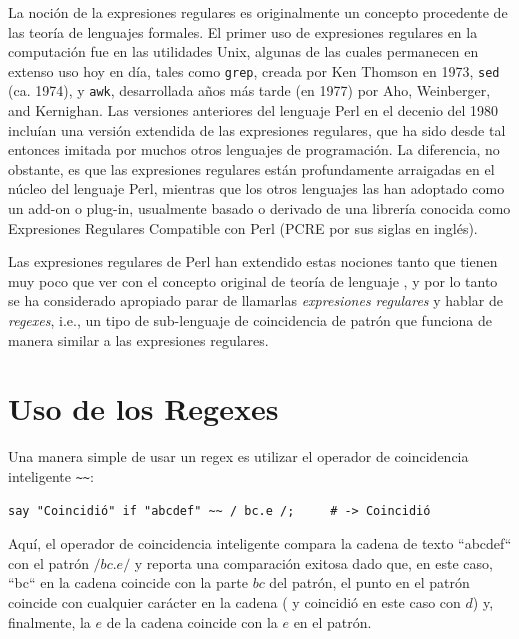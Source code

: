 La noción de la expresiones regulares es originalmente un 
concepto procedente de las teoría de lenguajes formales. 
El primer uso de expresiones regulares en la computación fue 
en las utilidades Unix, algunas de las cuales permanecen en 
extenso uso hoy en día, tales como {\tt grep}, creada por Ken Thomson en 1973,
{\tt sed} (ca. 1974), y {\tt awk}, desarrollada años más tarde (en 1977)
por  Aho, Weinberger, and Kernighan. 
Las versiones anteriores del lenguaje Perl en el decenio del 1980
incluían una versión extendida de las expresiones regulares, que 
ha sido desde tal entonces imitada por muchos otros lenguajes de
programación. La diferencia, no obstante, es que las expresiones
regulares están profundamente arraigadas en el núcleo del lenguaje
Perl, mientras que los otros lenguajes las han adoptado como un
add-on o plug-in, usualmente basado o derivado de una librería 
conocida como Expresiones Regulares Compatible con Perl (PCRE 
por sus siglas en inglés).

Las expresiones regulares de Perl han extendido estas nociones
tanto que tienen muy poco que ver con el concepto original de 
teoría de lenguaje , y por lo tanto se ha considerado 
apropiado parar de llamarlas \emph{expresiones regulares}
y hablar de \emph{regexes}, i.e., un tipo de sub-lenguaje
de coincidencia de patrón que funciona de manera similar
a las expresiones regulares.

\section{Uso de los Regexes}
\label{using_regexes}

Una manera simple de usar un regex es utilizar el operador
de coincidencia inteligente \verb|~~|:

\begin{verbatim}
say "Coincidió" if "abcdef" ~~ / bc.e /;     # -> Coincidió
\end{verbatim}
%

Aquí, el operador de coincidencia inteligente compara la 
cadena de texto ``abcdef`` con el patrón $/bc.e/$ y reporta
una comparación exitosa dado que, en este caso, ``bc`` en la
cadena coincide con la parte $bc$ del patrón, el punto en el
patrón coincide con cualquier carácter en la cadena (
y coincidió en este caso con $d$) y, finalmente, la $e$ de la
cadena coincide con la $e$ en el patrón.

